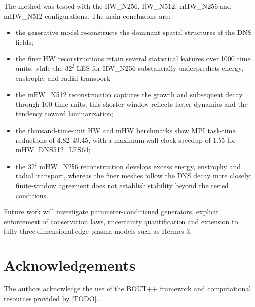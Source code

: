 \documentclass[authoryear,preprint,review,12pt]{elsarticle}
\begin{document}
The method was tested with the HW\_N256, HW\_N512, mHW\_N256 and mHW\_N512 configurations. The main conclusions are:

\begin{itemize}
    \item the generative model reconstructs the dominant spatial structures of the DNS fields;
    \item the finer HW reconstructions retain several statistical features over 1000 time units, while the $32^2$ LES for HW\_N256 substantially underpredicts energy, enstrophy and radial transport;
    \item the mHW\_N512 reconstruction captures the growth and subsequent decay through 100 time units; this shorter window reflects faster dynamics and the tendency toward laminarization;
    \item the thousand-time-unit HW and mHW benchmarks show MPI task-time reductions of 4.82--49.45, with a maximum wall-clock speedup of 1.55 for mHW\_DNS512\_LES64;
    \item the $32^2$ mHW\_N256 reconstruction develops excess energy, enstrophy and radial transport, whereas the finer meshes follow the DNS decay more closely; finite-window agreement does not establish stability beyond the tested conditions.
\end{itemize}

Future work will investigate parameter-conditioned generators, explicit enforcement of conservation laws, uncertainty quantification and extension to fully three-dimensional edge-plasma models such as Hermes-3.
%
%
%
%
%
%
%
\section*{Acknowledgements}

The authors acknowledge the use of the BOUT++ framework and computational resources provided by [TODO].



\end{document}
